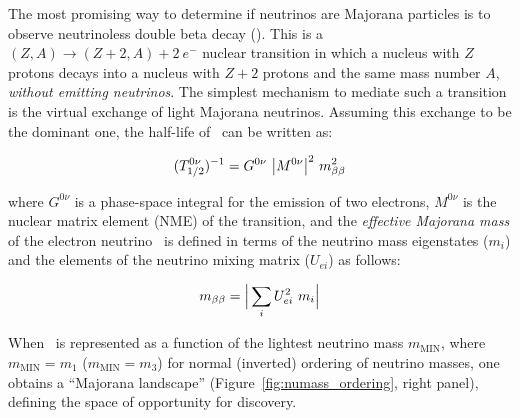 The most promising way to determine if neutrinos are Majorana particles is to observe neutrinoless double beta decay (\bbonu). This is a $(Z,A) \rightarrow (Z+2,A) + 2\ e^{-}$ nuclear transition in which a nucleus with $Z$ protons decays into a nucleus with $Z+2$ protons and the same mass number $A$, {\em without emitting neutrinos}. The simplest mechanism to mediate such a transition is the virtual exchange of light Majorana neutrinos. Assuming this exchange to be the  dominant one, the half-life of \bbonu\ can be written as:

\begin{equation}
(T^{0\nu}_{1/2})^{-1} = G^{0\nu} \ \big|M^{0\nu}\big|^{2} \ \mbb^{2}
\label{eq:halflife}
\end{equation}

\noindent where $G^{0\nu}$ is a phase-space integral for the emission of two electrons, $M^{0\nu}$ is the nuclear matrix element (NME) of the transition, and the \emph{effective Majorana mass} of the electron neutrino \mbb\ is defined in terms of the neutrino mass eigenstates ($m_{i}$) and the elements of the neutrino mixing matrix ($U_{ei}$) as follows:

\begin{equation}
m_{\beta\beta} = \Big| \sum_{i} U^{2}_{ei} \ m_{i} \Big|
\label{eq:mbb}
\end{equation}


When \mbb\ is represented as a function of the lightest neutrino mass $m_\mathrm{MIN}$, where $m_\mathrm{MIN}=m_1$ ($m_\mathrm{MIN}=m_3$) for normal (inverted) ordering of neutrino masses, one obtains a ``Majorana landscape'' (Figure~\ref{fig:numass_ordering}, right panel), defining the space of opportunity for discovery.

